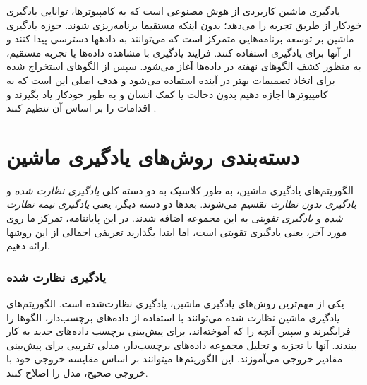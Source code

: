 


یادگیری ماشین کاربردی از هوش مصنوعی 
است که به کامپیوترها، توانایی یادگیری خودکار از طریق تجربه  را می‌دهد؛ بدون اینکه مستقیما برنامه‌ریزی شوند. حوزه یادگیری ماشین بر توسعه برنامه‌هایی متمرکز است که می‌توانند به داده\nf ها دسترسی پیدا کنند و از آن\nf ها برای یادگیری استفاده کنند. فرایند یادگیری با مشاهده داده‌ها یا تجربه مستقیم،  به منظور کشف الگوهای نهفته در داده‌ها آغاز می‌شود.  سپس از الگوهای  استخراج شده برای اتخاذ تصمیمات بهتر در آینده استفاده می‌شود و هدف اصلی این است که به کامپیوترها اجازه دهیم بدون دخالت یا کمک انسان و به طور خودکار یاد بگیرند و اقدامات را بر اساس آن تنظیم کنند
\cite{mldef}.

\section{
	دسته‌بندی روش‌های یادگیری ماشین
	\cite{mldef}
}
الگوریتم‌های یادگیری ماشین، به طور کلاسیک به دو دسته کلی 
\textit{یادگیری نظارت شده}
و 
\textit{یادگیری بدون نظارت}
تقسیم می‌شوند. بعدها دو دسته دیگر، یعنی 
\textit{یادگیری نیمه نظارت شده}
و
\textit{یادگیری تقویتی}
  به این مجموعه اضافه شدند. در این پایان\nf نامه، تمرکز ما روی مورد آخر، یعنی یادگیری تقویتی است، اما ابتدا بگذارید تعریفی اجمالی از این روش\nf ها ارائه دهیم.
\subsubsection{یادگیری نظارت شده}

یکی از مهم‌ترین روش‌های یادگیری ماشین، یادگیری نظارت‌شده است. الگوریتم‌های یادگیری ماشین نظارت ‌شده می‌توانند  با استفاده از داده‌های برچسب‌دار، الگوها را فرابگیرند و سپس آنچه را که آموخته‌اند، برای پیش‌بینی برچسب داده‌های جدید به کار ببندند. آن\nf ها با تجزیه و تحلیل مجموعه داده‌های برچسب‌دار، مدلی تقریبی برای پیش‌بینی مقادیر خروجی می‌‌آموزند. این الگوریتم‌ها می\nf توانند بر اساس مقایسه خروجی خود با خروجی صحیح، مدل را اصلاح کنند.

